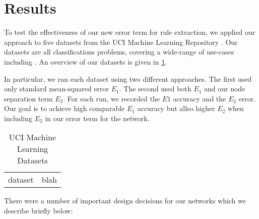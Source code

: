 \section{Results}
\label{sec:results}

To test the effectiveness of our new error term for rule extraction,
we applied our approach to five 
datasets from the UCI Machine Learning Repository \cite{uci}. Our
datasets are all classifications problems, covering a wide-range of
use-cases including
. An overview of our datasets is given in \ref{tab:datasets}.

In particular, we ran each dataset using two different approaches. The first
used only standard mean-squared error $E_1$. The second used both
$E_1$ and our node separation term $E_2$. For each run, we recorded
the $E1$ accuracy and the $E_2$ error. Our goal is to achieve
high comparable $E_1$ accuracy but allso higher $E_2$ when including
$E_2$ in our error term for the network.

\begin{table} 
  \begin{tabular}{|l|r|}
    dataset & blah \\
  \end{tabular}
  \caption{UCI Machine Learning Datasets }
  \label{tab:datasets}
\end{table}

There were a number of important design decisions for our networks
which we describe briefly below:

